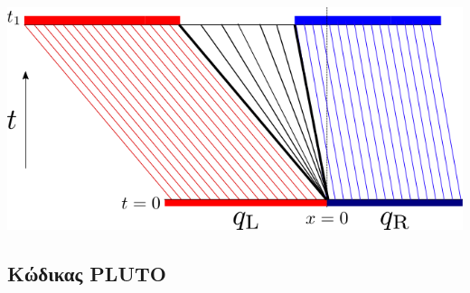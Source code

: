 \begin{marginfigure}
	\centering
	\includegraphics[width=1\linewidth]{Images/rarefuctionwave}
	\caption{}
	\label{fig:rarefuctionwave}
\end{marginfigure}



\subsection{Κώδικας PLUTO}

